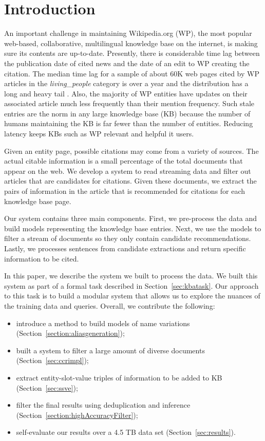 
\section{Introduction}


An important challenge in maintaining Wikipedia.org (WP), the most popular 
web-based, collaborative, multilingual knowledge base on the internet, is  
making sure its contents are up-to-date. Presently, there is considerable time lag 
between the publication date of cited news and the date of an edit to WP 
creating the citation. The median time lag for a sample of about 60K
web pages cited by WP articles in the \textit{living\_people} category is over 
a year and the distribution has a long and heavy tail \cite{JFrank12}. 
Also, the majority of WP entities have updates on their associated article much 
less frequently than their mention frequency. Such stale entries 
are the norm in any large knowledge base (KB) because the number of humans 
maintaining the KB is far fewer than the number of entities. 
Reducing latency keeps KBs such as WP relevant and helpful it users.

Given an entity page, possible citations may come from a variety of sources.
The actual citable information is a small percentage of the total documents that appear on the web.
We develop a system to read streaming data and filter out articles that are candidates for citations.
Given these documents, we extract the pairs of information in the 
article that is recommended for citations for each knowledge base page.

Our system contains three main components. First, we pre-process the data and
build models representing the knowledge base entries.
Next, we use the models to filter a stream of documents so they only contain 
candidate recommendations.
Lastly, we processes sentences from candidate extractions and return 
specific information to be cited.


In this paper, we describe the system we built to process the data.
We built this system as part of a formal task described in Section~\ref{sec:kbatask}.
Our approach to this task is to build a modular system
that allows us to explore the nuances of the training data and queries.
Overall, we contribute the following:
\begin{itemize}[noitemsep,nolistsep]
\item introduce a method to build models of name variations (Section~\ref{section:aliasgeneration});
\item built a system to filter a large amount of diverse documents (Section~\ref{sec:ccrimpl});
\item extract entity-slot-value triples of information to be added to KB (Section~\ref{sec:ssve});
\item filter the final results using deduplication and inference (Section~\ref{section:highAccuracyFilter});
\item self-evaluate our results over a 4.5 TB data set (Section~\ref{sec:results}).
\end{itemize}





